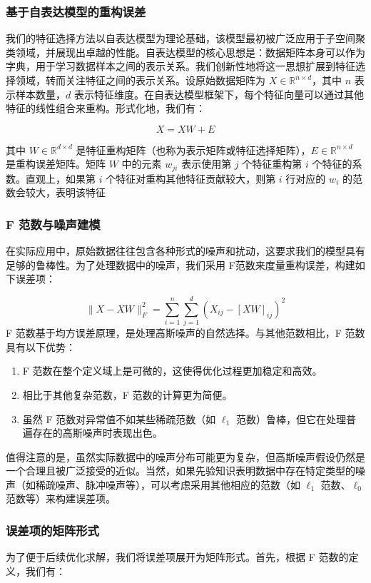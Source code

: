 \documentclass[12pt,a4paper,UTF8]{article}
\begin{document}
  \subsubsection{基于自表达模型的重构误差}
  我们的特征选择方法以自表达模型为理论基础，该模型最初被广泛应用于子空间聚类领域，并展现出卓越的性能。自表达模型的核心思想是：数据矩阵本身可以作为字典，用于学习数据样本之间的表示关系。我们创新性地将这一思想扩展到特征选择领域，转而关注特征之间的表示关系。设原始数据矩阵为 $X \in \mathbb{R}^{n \times d}$，其中 $n$ 表示样本数量，$d$ 表示特征维度。在自表达模型框架下，每个特征向量可以通过其他特征的线性组合来重构。形式化地，我们有：
  
  $$
  X = XW + E
  $$
  
  
  其中 $W \in \mathbb{R}^{d \times d}$ 是特征重构矩阵（也称为表示矩阵或特征选择矩阵），$E \in \mathbb{R}^{n \times d}$ 是重构误差矩阵。矩阵 $W$ 中的元素 $w_{ji}$ 表示使用第 $j$ 个特征重构第 $i$ 个特征的系数。直观上，如果第 $i$ 个特征对重构其他特征贡献较大，则第 $i$ 行对应的 $w_i$ 的范数会较大，表明该特征
  
  \subsubsection{F 范数与噪声建模}
  在实际应用中，原始数据往往包含各种形式的噪声和扰动，这要求我们的模型具有足够的鲁棒性。为了处理数据中的噪声，我们采用 F范数来度量重构误差，构建如下误差项：
  
  $$
  \|X - XW\|_F^2 = \sum_{i=1}^n\sum_{j=1}^d (X_{ij} - [XW]_{ij})^2
  $$
  F 范数基于均方误差原理，是处理高斯噪声的自然选择。与其他范数相比，F 范数具有以下优势：
   \begin{enumerate}
  	\item F 范数在整个定义域上是可微的，这使得优化过程更加稳定和高效。
  	\item 相比于其他复杂范数，F 范数的计算更为简便。
  	\item  虽然 F 范数对异常值不如某些稀疏范数（如 $\ell_1$ 范数）鲁棒，但它在处理普遍存在的高斯噪声时表现出色。
  \end{enumerate}
  
  
  值得注意的是，虽然实际数据中的噪声分布可能更为复杂，但高斯噪声假设仍然是一个合理且被广泛接受的近似。当然，如果先验知识表明数据中存在特定类型的噪声（如稀疏噪声、脉冲噪声等），可以考虑采用其他相应的范数（如 $\ell_1$ 范数、$\ell_0$ 范数等）来构建误差项。
  
 
 \subsubsection{误差项的矩阵形式}
 为了便于后续优化求解，我们将误差项展开为矩阵形式。首先，根据 F 范数的定义，我们有：
 
\end{document}

